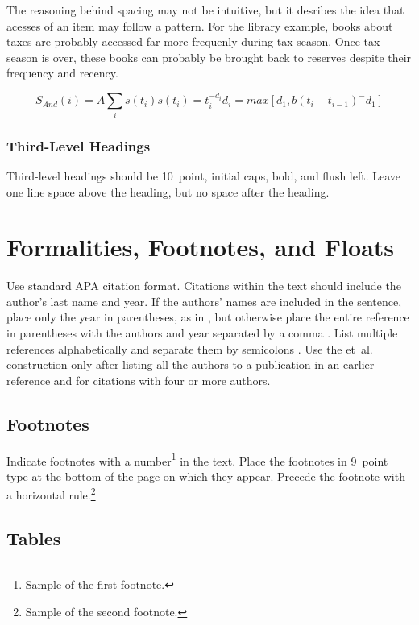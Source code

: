 \documentclass[10pt,letterpaper]{article}
\begin{document}
The reasoning behind spacing may not be intuitive, but it desribes the idea that
acesses of an item may follow a pattern. For the library example, books about taxes are probably
accessed far more frequenly during tax season. Once tax season is over, these books can
probably be brought back to reserves despite their frequency and recency. 

$$
S_{And}(i) = A \sum_i s(t_i)
s(t_i) = t_i^{-d_i}
d_i = max[d_1, b(t_i- t_{i-1})^-d_1]
$$


\subsubsection{Third-Level Headings}

Third-level headings should be 10~point, initial caps, bold, and flush
left. Leave one line space above the heading, but no space after the
heading.


\section{Formalities, Footnotes, and Floats}

Use standard APA citation format. Citations within the text should
include the author's last name and year. If the authors' names are
included in the sentence, place only the year in parentheses, as in
, but otherwise place the entire reference in
parentheses with the authors and year separated by a comma
\cite{NewellSimon1972a}. List multiple references alphabetically and
separate them by semicolons
\cite{ChalnickBillman1988a,NewellSimon1972a}. Use the
et~al. construction only after listing all the authors to a
publication in an earlier reference and for citations with four or
more authors.


\subsection{Footnotes}

Indicate footnotes with a number\footnote{Sample of the first
  footnote.} in the text. Place the footnotes in 9~point type at the
bottom of the page on which they appear. Precede the footnote with a
horizontal rule.\footnote{Sample of the second footnote.}


\subsection{Tables}
\end{document}
